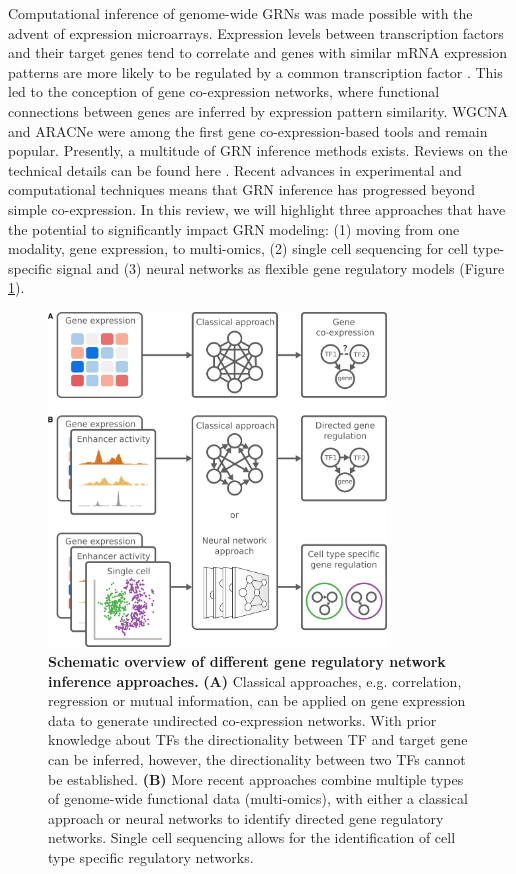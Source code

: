 Computational inference of genome-wide GRNs was made possible with the advent of expression microarrays. Expression levels between transcription factors and their target genes tend to correlate \cite{Ideker_2001} and genes with similar mRNA expression patterns are more likely to be regulated by a common transcription factor \cite{Allocco_2004,Eisen_1998}. This led to the conception of gene co-expression networks, where functional connections between genes are inferred by expression pattern similarity. WGCNA \cite{Zhang_2005} and ARACNe \cite{Margolin_2006} were among the first gene co-expression-based tools and remain popular. Presently, a multitude of GRN inference methods exists. Reviews on the technical details can be found here \cite{Levine_2005,Chasman_2017,Delgado_2019,Mercatelli_2020}. Recent advances in experimental and computational techniques means that GRN inference has progressed beyond simple co-expression. In this review, we will highlight three approaches that have the potential to significantly impact GRN modeling: (1) moving from one modality, gene expression, to multi-omics, (2) single cell sequencing for cell type-specific signal and (3) neural networks as flexible gene regulatory models (Figure \ref{fig:compapproach}).

\begin{figure}[H]
	\centering
	\includegraphics[width=0.8\textwidth]{ch.compapproach/images/compapproach.png}
	\caption{\label{fig:compapproach}\textbf{Schematic overview of different gene regulatory network inference approaches.} \textbf{(A)} Classical approaches, e.g. correlation, regression or mutual information, can be applied on gene expression data to generate undirected co-expression networks. With prior knowledge about TFs the directionality between TF and target gene can be inferred, however, the directionality between two TFs cannot be established. \textbf{(B)} More recent approaches combine multiple types of genome-wide functional data (multi-omics), with either a classical approach or neural networks to identify directed gene regulatory networks. Single cell sequencing allows for the identification of cell type specific regulatory networks.}
\end{figure}

